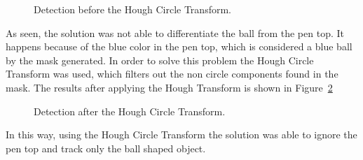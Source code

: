 \documentclass[10pt,twocolumn,letterpaper]{article}
\begin{document}
\begin{figure}[!h]
\centering
\setlength{\fboxsep}{1pt}
\setlength{\fboxrule}{1pt}
\caption{Detection before the Hough Circle Transform.}\label{fig:not_hough}
\end{figure}

As seen, the solution was not able to differentiate the ball from the pen top. It happens because of the blue color in the pen top, which is considered a blue ball by the mask generated. In order to solve this problem the Hough Circle Transform was used, which filters out the non circle components found in the mask. The results after applying the Hough Transform is shown in Figure~\ref{fig:yes_hough}

\begin{figure}[!h]
\centering
\setlength{\fboxsep}{1pt}
\setlength{\fboxrule}{1pt}
\caption{Detection after the Hough Circle Transform.}\label{fig:yes_hough}
\end{figure}

In this way,  using the Hough Circle Transform the solution was able to ignore the pen top and track only the ball shaped object.
\end{document}
